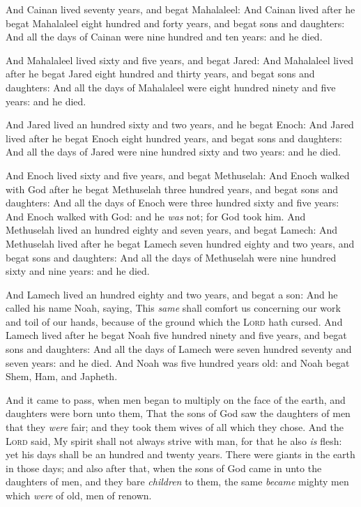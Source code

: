 \documentclass[11pt,letterpaper,oneside]{memoir}
\begin{document}
And Cainan lived seventy years, and begat Mahalaleel: And Cainan lived
after he begat Mahalaleel eight hundred and forty years, and begat sons
and daughters: And all the days of Cainan were nine hundred and ten
years: and he died.

And Mahalaleel lived sixty and five years, and begat Jared: And
Mahalaleel lived after he begat Jared eight hundred and thirty years,
and begat sons and daughters: And all the days of Mahalaleel were eight
hundred ninety and five years: and he died.

And Jared lived an hundred sixty and two years, and he begat Enoch: And
Jared lived after he begat Enoch eight hundred years, and begat sons and
daughters: And all the days of Jared were nine hundred sixty and two
years: and he died.

And Enoch lived sixty and five years, and begat Methuselah: And Enoch
walked with God after he begat Methuselah three hundred years, and begat
sons and daughters: And all the days of Enoch were three hundred sixty
and five years: And Enoch walked with God: and he \emph{was} not; for
God took him. And Methuselah lived an hundred eighty and seven years,
and begat Lamech: And Methuselah lived after he begat Lamech seven
hundred eighty and two years, and begat sons and daughters: And all the
days of Methuselah were nine hundred sixty and nine years: and he died.

And Lamech lived an hundred eighty and two years, and begat a son: And
he called his name Noah, saying, This \emph{same} shall comfort us
concerning our work and toil of our hands, because of the ground which
the \textsc{Lord} hath cursed. And Lamech lived after he begat Noah five
hundred ninety and five years, and begat sons and daughters: And all the
days of Lamech were seven hundred seventy and seven years: and he died.
And Noah was five hundred years old: and Noah begat Shem, Ham, and
Japheth.

And it came to pass, when men began to multiply on the face of the
earth, and daughters were born unto them, That the sons of God saw the
daughters of men that they \emph{were} fair; and they took them wives of
all which they chose. And the \textsc{Lord} said, My spirit shall not
always strive with man, for that he also \emph{is} flesh: yet his days
shall be an hundred and twenty years. There were giants in the earth in
those days; and also after that, when the sons of God came in unto the
daughters of men, and they bare \emph{children} to them, the same
\emph{became} mighty men which \emph{were} of old, men of renown.
\end{document}
